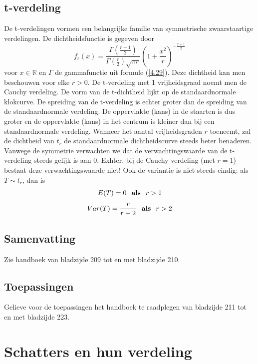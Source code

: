 \documentclass[titlepage]{article}
\numberwithin{equation}{section}
\begin{document}
\subsection{t-verdeling}
De t-verdelingen vormen een belangrijke familie van symmetrische zwaarstaartige verdelingen. De dichtheidsfunctie is gegeven door
\begin{equation}
	f_r(x) = \frac{\Gamma\left(\frac{r+1}{2}\right)}{\Gamma\left(\frac{r}{2}\right)\sqrt{\pi r}}\left(1+\frac{x^2}{r}\right)^{-\frac{r+1}{2}}
	\label{4.43}
\end{equation}
voor $x \in \mathbb{R}$ en $\Gamma$ de gammafunctie uit formule (\ref{4.29}). Deze dichtheid kan men beschouwen voor elke $r>0$.\newline\newline
De t-verdeling met 1 vrijheidsgraad noemt men de Cauchy verdeling. De vorm van de t-dichtheid lijkt op de standaardnormale klokcurve. De spreiding van de t-verdeling is echter groter dan de spreiding van de standaardnormale verdeling. De oppervlakte (kans) in de staarten is dus groter en de oppervlakte (kans) in het centrum is kleiner dan bij een standaardnormale verdeling. Wanneer het aantal vrijheidsgraden $r$ toeneemt, zal de dichtheid van $t_r$ de  standaardnormale dichtheidscurve steeds beter benaderen.\newline\newline
Vanwege de symmetrie verwachten we dat de verwachtingswaarde van de t-verdeling steeds gelijk is aan 0. Exhter, bij de Cauchy verdeling (met $r=1$) bestaat deze verwachtingswaarde niet! Ook de variantie is niet steeds eindig: als $T \sim t_r$, dan is
\begin{equation*}
	E(T) = 0 \text{ \textbf{ als } } r>1 
	\label{4.44}
\end{equation*}
\begin{equation}
	Var(T) = \frac{r}{r-2} \text{ \textbf{ als } } r>2
	\label{4.44}
\end{equation}
\subsection{Samenvatting}
Zie handboek van bladzijde 209 tot en met bladzijde 210.
\subsection{Toepassingen}
Gelieve voor de toepassingen het handboek te raadplegen van bladzijde 211 tot en met bladzijde 223.
\section{Schatters en hun verdeling}
\end{document}
